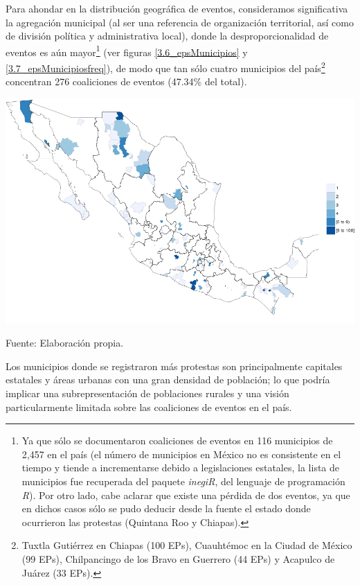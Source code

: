 \documentclass[letterpaper, 11pt]{book}
\theoremstyle{definition}
\theoremstyle{remark}
\begin{document}
Para ahondar en la distribución geográfica de eventos, consideramos significativa la agregación municipal (al ser una referencia de organización territorial, así como de división política y administrativa local), donde la desproporcionalidad de eventos es aún mayor\footnote{
    Ya que sólo se documentaron coaliciones de eventos en 116 municipios de 2,457 en el país (el número de municipios en México no es consistente en el tiempo y tiende a incrementarse debido a legislaciones estatales, la lista de municipios fue recuperada del paquete \emph{inegiR}, del lenguaje de programación \emph{R}). 
    Por otro lado, cabe aclarar que existe una pérdida de dos eventos, ya que en dichos casos sólo se pudo deducir desde la fuente el estado donde ocurrieron las protestas (Quintana Roo y Chiapas). 
    
} 
(ver figuras \ref{3.6_epsMunicipios} y \ref{3.7_epsMunicipiosfreq}), de modo que tan sólo cuatro municipios del país\footnote{
    Tuxtla Gutiérrez en Chiapas (100 EPs), Cuauhtémoc en la Ciudad de México (99 EPs), Chilpancingo de los Bravo en Guerrero (44 EPs) y Acapulco de Juárez (33 EPs).
} concentran 276 coaliciones de eventos (47.34\% del total). 

\hspace{-1em}\begin{minipage}{\linewidth}
\centering
{} \label{3.6_epsMunicipios}
\hspace{-1.5em}\includegraphics[scale=0.63]{img/3.6_epsMunicipios.png}
\par
\small Fuente: Elaboración propia.
\end{minipage}\bigskip

Los municipios donde se registraron más protestas son principalmente capitales estatales y áreas urbanas con una gran densidad de población; lo que podría implicar una subrepresentación de poblaciones rurales y una visión particularmente limitada sobre las coaliciones de eventos en el país. 
\end{document}
